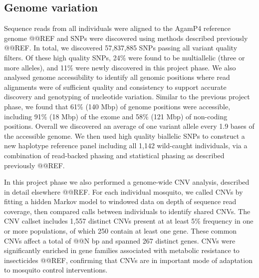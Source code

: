 \documentclass[a4paper,11pt,abstracton,hidelinks]{scrartcl}
\begin{document}
%


\subsection*{Genome variation}


%
Sequence reads from all individuals were aligned to the AgamP4 reference genome @@REF and SNPs were discovered using methods described previously @@REF.
%
In total, we discovered 57,837,885 SNPs passing all variant quality filters. 
%
Of these high quality SNPs, 24\% were found to be multiallelic (three or more alleles), and 11\% were newly discovered in this project phase.
%
We also analysed genome accessibility to identify all genomic positions where read alignments were of sufficient quality and consistency to support accurate discovery and genotyping of nucleotide variation.
%
Similar to the previous project phase, we found that 61\% (140 Mbp) of genome positions were accessible, including 91\% (18 Mbp) of the exome and 58\% (121 Mbp) of non-coding positions.
%
Overall we discovered an average of one variant allele every 1.9 bases of the accessible genome.
%
We then used high quality biallelic SNPs to construct a new haplotype reference panel including all 1,142 wild-caught individuals, via a combination of read-backed phasing and statistical phasing as described previously @@REF. 


In this project phase we also performed a genome-wide CNV analysis, described in detail elsewhere @@REF.
%
For each individual mosquito, we called CNVs by fitting a hidden Markov model to windowed data on depth of sequence read coverage, then compared calls between individuals to identify shared CNVs.
%
The CNV callset includes 1,557 distinct CNVs present at at least 5\% frequency in one or more populations, of which 250 contain at least one gene.
%
These common CNVs affect a total of @@N bp and spanned 267 distinct genes.
%
CNVs were significantly enriched in gene families associated with metabolic resistance to insecticides @@REF, confirming that CNVs are in important mode of adaptation to mosquito control interventions.
\end{document}

